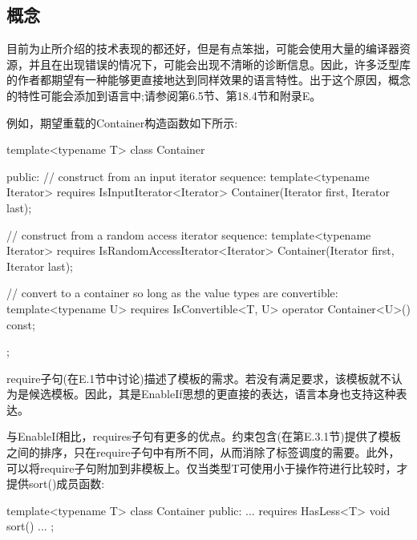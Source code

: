 \subsection{概念}

目前为止所介绍的技术表现的都还好，但是有点笨拙，可能会使用大量的编译器资源，并且在出现错误的情况下，可能会出现不清晰的诊断信息。因此，许多泛型库的作者都期望有一种能够更直接地达到同样效果的语言特性。出于这个原因，概念的特性可能会添加到语言中;请参阅第6.5节、第18.4节和附录E。

例如，期望重载的Container构造函数如下所示:

\begin{cpp}
template<typename T>
class Container {
	public:
	// construct from an input iterator sequence:
	template<typename Iterator>
	requires IsInputIterator<Iterator>
	Container(Iterator first, Iterator last);
	
	// construct from a random access iterator sequence:
	template<typename Iterator>
	requires IsRandomAccessIterator<Iterator>
	Container(Iterator first, Iterator last);
	
	// convert to a container so long as the value types are convertible:
	template<typename U>
	requires IsConvertible<T, U>
	operator Container<U>() const;
};
\end{cpp}

require子句(在E.1节中讨论)描述了模板的需求。若没有满足要求，该模板就不认为是候选模板。因此，其是EnableIf思想的更直接的表达，语言本身也支持这种表达。

与EnableIf相比，requires子句有更多的优点。约束包含(在第E.3.1节)提供了模板之间的排序，只在require子句中有所不同，从而消除了标签调度的需要。此外，可以将require子句附加到非模板上。仅当类型T可使用小于操作符进行比较时，才提供sort()成员函数:

\begin{cpp}
template<typename T>
class Container {
	public:
	...
	requires HasLess<T>
	void sort() {
		...
	}
};
\end{cpp}





